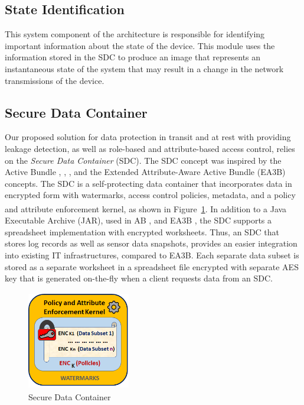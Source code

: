 \documentclass[conference]{IEEEtran}
\begin{document}

\subsection{State Identification}
This system component of the architecture is responsible for identifying important information about the state of the device. This module uses the information stored in the SDC to produce an image that represents an instantaneous state of the system that may result in a change in the network transmissions of the device. 

\subsection{Secure Data Container}
Our proposed solution for data protection in transit and at rest with providing leakage detection, as well as role-based and attribute-based access control, relies on the {\em Secure Data Container} (SDC). The SDC concept was inspired by the Active Bundle  \cite{c12}, \cite{c13}, \cite{c14}, \cite{c15} and the Extended Attribute-Aware Active Bundle (EA3B) \cite{c6} concepts. The SDC is a self-protecting data container that incorporates data in encrypted form with watermarks, access control policies, metadata, and a policy and attribute enforcement kernel, as shown in Figure~\ref{sdc}. In addition to a Java\textsuperscript{\textregistered} Executable Archive (JAR), used in AB \cite{c14}, \cite{c15} and EA3B \cite{c6}, the SDC supports a spreadsheet implementation with encrypted worksheets. Thus, an SDC that stores log records as well as sensor data snapshots, provides an easier integration into existing IT infrastructures, compared to EA3B. Each separate data subset is stored as a separate worksheet in a spreadsheet file encrypted with separate AES key that is generated on-the-fly when a client requests data from an SDC. 

\begin{figure}[htbp]
\centering
\centerline{\includegraphics [width=4.5cm, height=4.3cm]
{SDC-Rel.png}}
\caption{Secure Data Container}
\label{sdc}
\end{figure}
\end{document}
